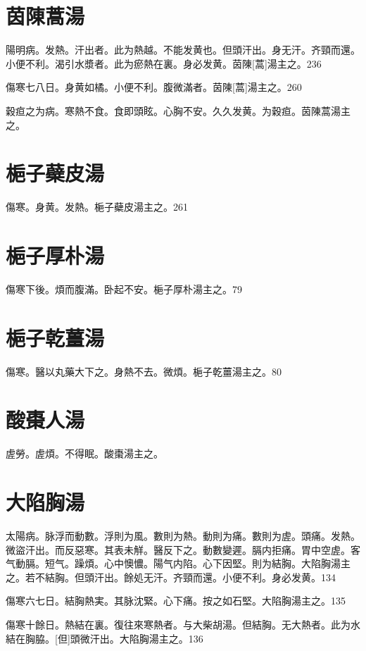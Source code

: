 \documentclass[12pt,twoside,UTF8,b5paper]{ctexbook}
\begin{document}
\section{茵陳蒿湯}

陽明病。发熱。汗出者。此为熱越。不能发黄也。但頭汗出。身无汗。齐頸而還。小便不利。渴引水漿者。此为瘀熱在裏。身必发黄。茵陳[蒿]湯主之。236

傷寒七八日。身黄如橘。小便不利。腹微滿者。茵陳[蒿]湯主之。260

穀疸之为病。寒熱不食。食即頭眩。心胸不安。久久发黄。为穀疸。茵陳蒿湯主之。

\section{梔子蘗皮湯}

傷寒。身黄。发熱。梔子蘗皮湯主之。261

\section{梔子厚朴湯}

傷寒下後。煩而腹滿。卧起不安。梔子厚朴湯主之。79

\section{梔子乾薑湯}

傷寒。醫以丸藥大下之。身熱不去。微煩。梔子乾薑湯主之。80

\section{酸棗人湯}

虗勞。虗煩。不得眠。酸棗湯主之。

\section{大陷胸湯}

太陽病。脉浮而動數。浮則为風。數則为熱。動則为痛。數則为虗。頭痛。发熱。微盜汗出。而反惡寒。其表未觧。醫反下之。動數變遲。膈内拒痛。胃中空虗。客气動膈。短气。躁煩。心中懊憹。陽气内陷。心下因堅。則为結胸。大陷胸湯主之。若不結胸。但頭汗出。餘処无汗。齐頸而還。小便不利。身必发黄。134

傷寒六七日。結胸熱実。其脉沈緊。心下痛。按之如石堅。大陷胸湯主之。135

傷寒十餘日。熱結在裏。復往來寒熱者。与大柴胡湯。但結胸。无大熱者。此为水結在胸脇。[但]頭微汗出。大陷胸湯主之。136
\end{document}
